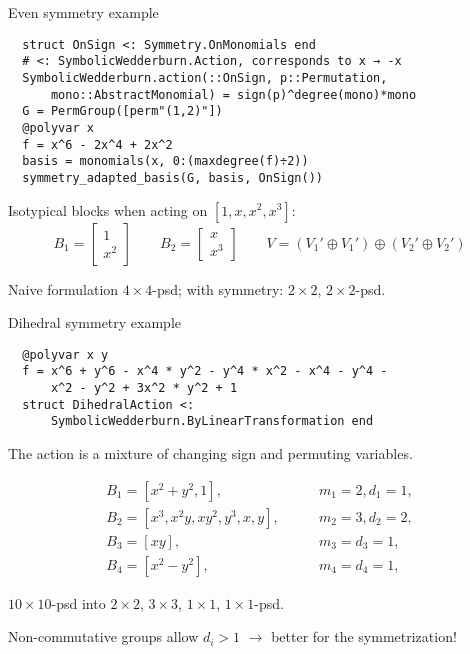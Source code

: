 \begin{frame}[fragile]{Even symmetry example}
\footnotesize
\begin{verbatim}
  struct OnSign <: Symmetry.OnMonomials end
  # <: SymbolicWedderburn.Action, corresponds to x → -x
  SymbolicWedderburn.action(::OnSign, p::Permutation,
      mono::AbstractMonomial) = sign(p)^degree(mono)*mono
  G = PermGroup([perm"(1,2)"])
  @polyvar x
  f = x^6 - 2x^4 + 2x^2
  basis = monomials(x, 0:(maxdegree(f)÷2))
  symmetry_adapted_basis(G, basis, OnSign())
\end{verbatim}

  Isotypical blocks when acting on $[1, x, x^2, x^3]$:
\[
  B_1 = \begin{bmatrix}
          1\\
          x^2
        \end{bmatrix}
  \qquad
  B_2 = \begin{bmatrix}
          x\\
          x^3
        \end{bmatrix}
  \qquad
  V = (V_1' \oplus V_1') \oplus (V_2' \oplus V_2')
\]

  \vspace{-1em}

Naive formulation $4\times 4$-psd; with symmetry: $2\times 2$, $2\times 2$-psd.
\end{frame}

\begin{frame}[fragile]{Dihedral symmetry example}
\footnotesize
  \begin{verbatim}
  @polyvar x y
  f = x^6 + y^6 - x^4 * y^2 - y^4 * x^2 - x^4 - y^4 -
      x^2 - y^2 + 3x^2 * y^2 + 1
  struct DihedralAction <:
      SymbolicWedderburn.ByLinearTransformation end
  \end{verbatim}
  The action is a mixture of changing sign and permuting variables.

  \vspace{-2em}

  \begin{align*}
    B_1 = [x^2 + y^2, 1], & \qquad m_1 = 2, d_1 = 1,\\
    B_2 = [x^3, x^2y, xy^2, y^3, x, y], & \qquad m_2 = 3, d_2 = 2,\\
    B_3 = [xy], & \qquad m_3 = d_3 = 1,\\
    B_4 = [x^2 - y^2], & \qquad m_4 = d_4 = 1,
  \end{align*}

  \vspace{-1em}

  $10 \times 10$-psd into $2 \times 2$, $3 \times 3$, $1 \times 1$, $1 \times 1$-psd.

  \vspace{-1em}

  \alert{Non}-commutative groups allow $d_i > 1$ $\to$ \alert{better} for the symmetrization!
\end{frame}

